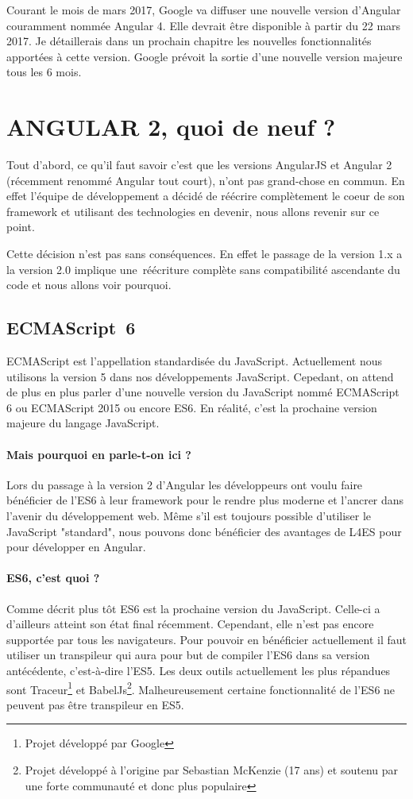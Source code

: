 Courant le mois de mars 2017, Google va diffuser une nouvelle version d'Angular couramment nommée Angular 4\label{angular4-release}. Elle devrait être disponible à partir du 22 mars 2017. Je détaillerais dans un prochain chapitre les nouvelles fonctionnalités apportées à cette version.
Google prévoit la sortie d'une nouvelle version majeure tous les 6 mois.

\section{ANGULAR 2, quoi de neuf ?}
Tout d'abord, ce qu’il faut savoir c'est que les versions AngularJS et Angular 2 (récemment renommé Angular tout court), n'ont pas grand-chose en commun. En effet l'équipe de développement a décidé de réécrire complètement le coeur de son framework et utilisant des technologies en devenir, nous allons revenir sur ce point.

Cette décision n'est pas sans conséquences. En effet le passage de la version 1.x a la version 2.0 implique une réécriture complète sans compatibilité ascendante du code et nous allons voir pourquoi.

\subsection{ECMAScript 6}

ECMAScript est l'appellation standardisée du JavaScript. Actuellement nous utilisons la version 5 dans nos développements JavaScript. Cepedant, on attend de plus en plus parler d'une nouvelle version du JavaScript nommé ECMAScript 6 ou ECMAScript 2015 ou encore ES6. En réalité, c'est la prochaine version majeure du langage JavaScript.

\paragraph{Mais pourquoi en parle-t-on ici ?}
Lors du passage à la version 2 d'Angular les développeurs ont voulu faire bénéficier de l'ES6 à leur framework pour le rendre plus moderne et l'ancrer dans l'avenir du développement web. Même s'il est toujours possible d'utiliser le JavaScript "standard", nous pouvons donc bénéficier des avantages de L4ES pour pour développer en Angular.

\paragraph{ES6, c'est quoi ?}
Comme décrit plus tôt ES6 est la prochaine version du JavaScript. Celle-ci a d'ailleurs atteint son état final récemment. Cependant, elle n'est pas encore supportée par tous les navigateurs. Pour pouvoir en bénéficier actuellement il faut utiliser un transpileur qui aura pour but de compiler l'ES6 dans sa version antécédente, c'est-à-dire l'ES5. Les deux outils actuellement les plus répandues sont Traceur\footnote{Projet développé par Google} et BabelJs\footnote{Projet développé à l'origine par Sebastian McKenzie (17 ans) et soutenu par une forte communauté et donc plus populaire}. Malheureusement certaine fonctionnalité de l'ES6 ne peuvent pas être transpileur en ES5.

